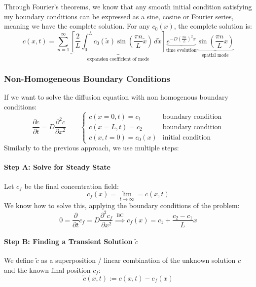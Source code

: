 Through Fourier's theorems, we know that any smooth initial condition satisfying my boundary conditions can be expressed as a sine, cosine or Fourier series, meaning we have the complete solution. For any $c_0(x)$, the complete solution is:
\begin{equation}
	\boxed{c(x,t) = \sum_{n=1}^\infty \underbrace{\left[ \frac 2L \int_0^L c_0(\tilde  x)\sin\left(\frac{\pi n}L\tilde x\right)\,d\tilde x\right]}_{\text{expansion coefficient of mode}} \underbrace{e^{-D\left(\frac{\pi n}{L}\right)^2x}}_{\text{time evolution}}\underbrace{\sin\left(\frac{\pi n}{L} x\right)}_{\text{spatial mode}}}
\end{equation}

\subsubsection{Non-Homogeneous Boundary Conditions}
If we want to solve the diffusion equation with non homogenous boundary conditions:
\begin{equation*}
	\frac{\partial c}{\partial t} = D\frac{\partial ^2 c}{\partial x^2}\qquad \begin{cases}
		c(x=0,t) = c_1& \text{boundary condition}\\
		c(x=L,t) = c_2& \text{boundary condition}\\
		c(x,t=0) = c_0(x) & \text{initial condition}
	\end{cases}
\end{equation*}
Similarly to the previous approach, we use multiple steps:

\paragraph{Step A: Solve for Steady State} Let $c_f$ be the final concentration field:
\begin{equation*}
	c_f(x)=\lim_{t\to \infty} = c(x,t)
\end{equation*}
We know how to solve this, applying the boundary conditions of the problem:
\begin{equation*}
	0=\frac{\partial }{\partial t} c_f = D\frac{\partial ^2 c_f}{\partial x^2}\stackrel{\text{BC}}{\implies}c_f(x) = c_1 + \frac{c_2-c_1}{L}x
\end{equation*}

\paragraph{Step B: Finding a Transient Solution $\tilde c$}
We define $\tilde c$ as a superposition / linear combination of the unknown solution $c$ and the known final position $c_f$:
\begin{equation*}
	\tilde c(x,t) := c(x,t) - c_f(x)
\end{equation*}


